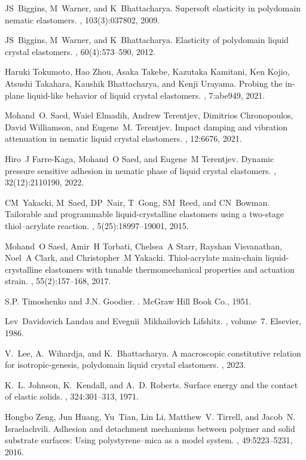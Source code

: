 \documentclass[12pt]{article}
\begin{document}
\begin{thebibliography}{10}
JS~Biggins, M~Warner, and K~Bhattacharya.
\newblock Supersoft elasticity in polydomain nematic elastomers.
, 103(3):037802, 2009.

JS~Biggins, M~Warner, and K~Bhattacharya.
\newblock Elasticity of polydomain liquid crystal elastomers.
, 60(4):573--590, 2012.

Haruki Tokumoto, Hao Zhou, Asaka Takebe, Kazutaka Kamitani, Ken Kojio, Atsushi
  Takahara, Kaushik Bhattacharya, and Kenji Urayama.
\newblock Probing the in-plane liquid-like behavior of liquid crystal
  elastomers.
, 7:abe949, 2021.

Mohand~O. Saed, Waiel Elmadih, Andrew Terentjev, Dimitrios Chronopoulos, David
  Williamson, and Eugene~M. Terentjev.
\newblock Impact damping and vibration attenuation in nematic liquid crystal
  elastomers.
, 12:6676, 2021.

Hiro~J Farre-Kaga, Mohand~O Saed, and Eugene~M Terentjev.
\newblock Dynamic pressure sensitive adhesion in nematic phase of liquid
  crystal elastomers.
, 32(12):2110190, 2022.

CM~Yakacki, M~Saed, DP~Nair, T~Gong, SM~Reed, and CN~Bowman.
\newblock Tailorable and programmable liquid-crystalline elastomers using a
  two-stage thiol--acrylate reaction.
, 5(25):18997--19001, 2015.

Mohand~O Saed, Amir~H Torbati, Chelsea~A Starr, Rayshan Visvanathan, Noel~A
  Clark, and Christopher~M Yakacki.
\newblock Thiol-acrylate main-chain liquid-crystalline elastomers with tunable
  thermomechanical properties and actuation strain.
, 55(2):157--168, 2017.

S.P. Timoshenko and J.N. Goodier.
.
\newblock McGraw Hill Book Co., 1951.

Lev~Davidovich Landau and Evegnii~Mikhailovich Lifshitz.
, volume~7.
\newblock Elsevier, 1986.

V.~Lee, A.~Wihardja, and K.~Bhattacharya.
\newblock A macroscopic constitutive relation for isotropic-genesis, polydomain
  liquid crystal elastomers.
, 2023.

K.~L. Johnson, K.~Kendall, and A.~D. Roberts.
\newblock Surface energy and the contact of elastic solids.
, 324:301--313, 1971.

Hongbo Zeng, Jun Huang, Yu~Tian, Lin Li, Matthew~V. Tirrell, and Jacob~N.
  Israelachvili.
\newblock Adhesion and detachment mechanisms between polymer and solid
  substrate surfaces: Using polystyrene–mica as a model system.
, 49:5223--5231, 2016.

\end{thebibliography}
\end{document}
